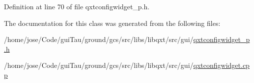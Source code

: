 Definition at line 70 of file qxtconfigwidget\-\_\-p.\-h.



The documentation for this class was generated from the following files\-:\begin{DoxyCompactItemize}
\item 
/home/jose/\-Code/gui\-Tau/ground/gcs/src/libs/libqxt/src/gui/\hyperlink{qxtconfigwidget__p_8h}{qxtconfigwidget\-\_\-p.\-h}\item 
/home/jose/\-Code/gui\-Tau/ground/gcs/src/libs/libqxt/src/gui/\hyperlink{qxtconfigwidget_8cpp}{qxtconfigwidget.\-cpp}\end{DoxyCompactItemize}
